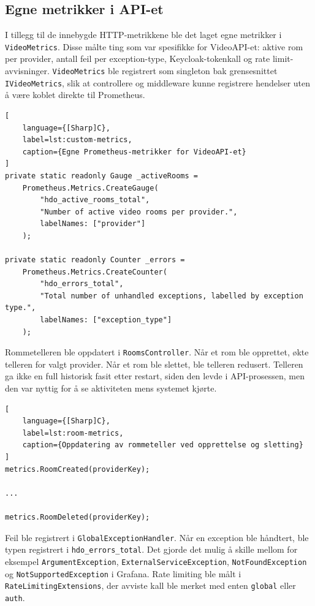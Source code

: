 \subsection{Egne metrikker i API-et}

I tillegg til de innebygde HTTP-metrikkene ble det laget egne metrikker i \texttt{VideoMetrics}. Disse målte ting som var spesifikke for VideoAPI-et: aktive rom per provider, antall feil per exception-type, Keycloak-tokenkall og rate limit-avvisninger. \texttt{VideoMetrics} ble registrert som singleton bak grensesnittet \texttt{IVideoMetrics}, slik at controllere og middleware kunne registrere hendelser uten å være koblet direkte til Prometheus.

\begin{lstlisting}[
    language={[Sharp]C},
    label=lst:custom-metrics,
    caption={Egne Prometheus-metrikker for VideoAPI-et}
]
private static readonly Gauge _activeRooms =
    Prometheus.Metrics.CreateGauge(
        "hdo_active_rooms_total",
        "Number of active video rooms per provider.",
        labelNames: ["provider"]
    );

private static readonly Counter _errors =
    Prometheus.Metrics.CreateCounter(
        "hdo_errors_total",
        "Total number of unhandled exceptions, labelled by exception type.",
        labelNames: ["exception_type"]
    );
\end{lstlisting}

Rommetelleren ble oppdatert i \texttt{RoomsController}. Når et rom ble opprettet, økte telleren for valgt provider. Når et rom ble slettet, ble telleren redusert. Telleren ga ikke en full historisk fasit etter restart, siden den levde i API-prosessen, men den var nyttig for å se aktiviteten mens systemet kjørte.

\begin{lstlisting}[
    language={[Sharp]C},
    label=lst:room-metrics,
    caption={Oppdatering av rommeteller ved opprettelse og sletting}
]
metrics.RoomCreated(providerKey);

...

metrics.RoomDeleted(providerKey);
\end{lstlisting}

Feil ble registrert i \texttt{GlobalExceptionHandler}. Når en exception ble håndtert, ble typen registrert i \texttt{hdo\_errors\_total}. Det gjorde det mulig å skille mellom for eksempel \texttt{ArgumentException}, \texttt{ExternalServiceException}, \texttt{NotFoundException} og \texttt{NotSupportedException} i Grafana. Rate limiting ble målt i \texttt{RateLimitingExtensions}, der avviste kall ble merket med enten \texttt{global} eller \texttt{auth}.

